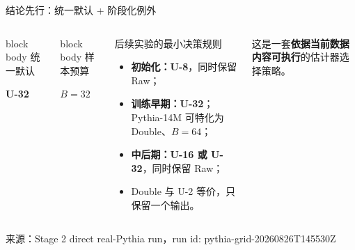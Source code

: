 \documentclass[10pt,aspectratio=169]{beamer}
\newcommand{\best}[1]{\textcolor{secondary}{\textbf{#1}}}
\newcommand{\keypoint}[1]{\textcolor{good}{\textbf{#1}}}
\newcommand{\sourcefoot}[1]{\vspace{1mm}\par{\scriptsize\color{muted}来源：#1}}
\newcommand{\metriccard}[3]{%
  \begin{beamercolorbox}[rounded=true,sep=0.7em,wd=\linewidth]{block body}
    {\scriptsize\color{muted}#1}\par
    {\Large\bfseries\color{#3}#2}
  \end{beamercolorbox}}
\begin{document}
\begin{frame}{结论先行：统一默认 + 阶段化例外}
  \begin{columns}[T,onlytextwidth]
      \metriccard{统一默认}{U-32}{secondary}
      \vspace{2mm}
      \metriccard{样本预算}{$B=32$}{good}
      \begin{block}{后续实验的最小决策规则}
        \begin{itemize}
          \item \best{初始化：U-8}，同时保留 Raw；
          \item \best{训练早期：U-32}；Pythia-14M 可特化为 Double、$B=64$；
          \item \best{中后期：U-16 或 U-32}，同时保留 Raw；
          \item Double 与 U-2 等价，只保留一个输出。
        \end{itemize}
      \end{block}
      \vspace{1mm}
      {\small 这是一套\keypoint{依据当前数据内容可执行}的估计器选择策略。}
  \end{columns}
  \sourcefoot{Stage 2 direct real-Pythia run，run id: pythia-grid-20260826T145530Z}
\end{frame}
\end{document}
